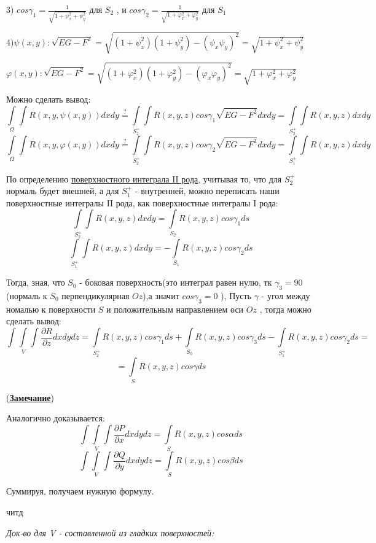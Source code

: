 \documentclass[12pt]{article}
\begin{document}
3) \hyperref[eq10]{$cos\gamma_1 = \frac{1}{\sqrt{1 + \psi_x^2 + \psi_y^2 }}$} для $S_2$ , и $cos\gamma_2 = \frac{1}{\sqrt{1 + \varphi_x^2 + \varphi_y^2 }} $ для $S_1$

4)$\psi(x,y) : \sqrt{EG - F^2} = \sqrt{(1 + \psi_x^2)(1 + \psi_y^2) - (\psi_x \psi_y)^2} = \sqrt{1 + \psi_x^2 + \psi_y^2 }$

  \par $\varphi(x,y) : \sqrt{EG - F^2} = \sqrt{(1 + \varphi_x^2)(1 + \varphi_y^2) - (\varphi_x \varphi_y)^2} = \sqrt{1 + \varphi_x^2 + \varphi_y^2 }$

Можно сделать вывод:
$$
\int\limits_{\Omega}\int R(x,y,\psi(x,y))dxdy 
\stackrel{?}{=}
\int\limits_{S_2^+}\int R(x,y,z)  cos\gamma_1  \sqrt{EG - F^2} dxdy
=
\int\limits_{S_2^+}\int R(x,y,z)dxdy
$$
$$
\int\limits_{\Omega}\int R(x,y,\varphi(x,y))dxdy 
\stackrel{?}{=}
\int\limits_{S_2^+}\int R(x,y,z)  cos\gamma_2  \sqrt{EG - F^2} dxdy
= 
\int\limits_{S_1^+}\int R(x,y,z)dxdy
$$


По определению \hyperref[eq9]{поверхностного интеграла II рода}, учитывая то, что для $S_2^+$
нормаль будет внешней, а для $S_1^+$ - внутренней, можно переписать наши поверхностные интегралы II рода,
как поверхностные интегралы I рода:
	$$\int\limits_{S_2^+}\int R(x,y,z)dxdy = \int\limits_{S_2} R(x,y,z)cos\gamma_1 ds$$
	$$\int\limits_{S_1^+}\int R(x,y,z)dxdy = -\int\limits_{S_1} R(x,y,z)cos\gamma_2 ds$$

Тогда, зная, что $S_0$ - боковая поверхность(это интеграл равен нулю, тк $\gamma_3 = 90$(нормаль к $S_0$ перпендикулярная $Oz$),а значит $cos\gamma_3 = 0$ ), Пусть $\gamma$ - угол между номалью к поверхности $S$ и положительным направлением оси $Oz$ ,
тогда можно сделать вывод:
$$
\int\int\limits_{V}\int \frac{\partial R}{\partial z}dxdydz = \int\limits_{S_2^+} R(x,y,z)cos\gamma_1 ds + 
\int\limits_{S_0} R(x,y,z)cos\gamma_3 ds - \int\limits_{S_1^+} R(x,y,z)cos\gamma_2 ds =
$$
$$
=
\int\limits_{S} R(x,y,z)cos\gamma ds 
$$

(\hyperref[eq11]{\textbf{Замечание}})

Аналогично доказывается:
$$
\int\int\limits_{V}\int \frac{\partial P}{\partial x}dxdydz = \int\limits_{S} R(x,y,z)cos\alpha ds 
$$
$$
\int\int\limits_{V}\int \frac{\partial Q}{\partial y}dxdydz = \int\limits_{S} R(x,y,z)cos\beta ds 
$$

Суммируя, получаем нужную формулу.

читд

\textit{Док-во для V - составленной из гладких поверхностей:}
\end{document}
